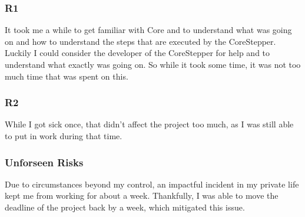 \subsubsection*{R1}
It took me a while to get familiar with Core and to understand what was going on and how to understand the steps that are executed by the CoreStepper.
Luckily I could consider the developer of the CoreStepper for help and to understand what exactly was going on.
So while it took some time, it was not too much time that was spent on this.

\subsubsection*{R2}
While I got sick once,
that didn't affect the project too much,
as I was still able to put in work during that time.

\subsubsection*{Unforseen Risks}
Due to circumstances beyond my control,
an impactful incident in my private life kept me from working for about a week.
Thankfully, I was able to move the deadline of the project back by a week,
which mitigated this issue.
